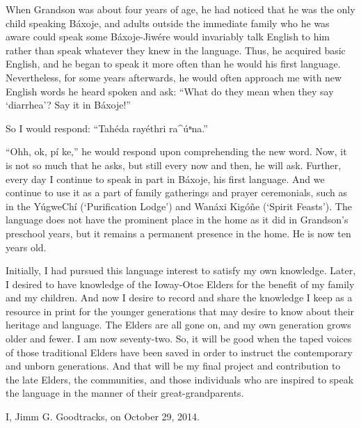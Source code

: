 \documentclass[output=paper]{LSP/langsci}
\begin{document}
When Grandson was about four years of age, he had noticed that he was the only child speaking Báxoje, and adults outside the immediate family who he was aware could speak some Báxoje-Jiwére would invariably talk English to him rather than speak whatever they knew in the language. Thus, he acquired basic English, and he began to speak it more often than he would his first language. Nevertheless, for some years afterwards, he would often approach me with new English words he heard spoken and ask: ``What do they mean when they say `diarrhea'? Say it in Báxoje!''

So I would respond: ``Tahéda rayéthri ra\^{ }úⁿna.''
	
``Ohh, ok, pí ke,'' he would respond upon comprehending the new word. Now, it is not so much that he asks, but still every now and then, he will ask. Further, every day I continue to speak in part in Báxoje, his first language. And we continue to use it as a part of family gatherings and prayer ceremonials, such as in the YúgweChí (`Purification Lodge') and Wanáxi Kigóñe (`Spirit Feasts'). The language does not have the prominent place in the home as it did in Grandson's preschool years, but it remains a permanent presence in the home. He is now ten years old.

Initially, I had pursued this language interest to satisfy my own knowledge. Later, I desired to have knowledge of the Ioway-Otoe Elders for the benefit of my family and my children. And now I desire to record and share the knowledge I keep as a resource in print for the younger generations that may desire to know about their heritage and language. The Elders are all gone on, and my own generation grows older and fewer. I am now seventy-two. So, it will be good when the taped voices of those traditional Elders have been saved in order to instruct the contemporary and unborn generations. And that will be my final project and contribution to the late Elders, the communities, and those individuals who are inspired to speak the language in the manner of their great-grandparents.

I, Jimm G. Goodtracks, on October 29, 2014.
\end{document}
